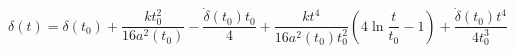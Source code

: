 \begin{equation}\label{deltageneral2}
\delta(t)=\delta(t_0)+\frac{kt_0^2}{16a^2(t_0)}-\frac{\dot{\delta}(t_0)t_0}{4}+
\frac{kt^4}{16a^2(t_0)t_0^2}(4\ln\frac{t}{t_0}-1)+\frac{\dot{\delta}(t_0)t^4}{4t_0^3}
\end{equation}


